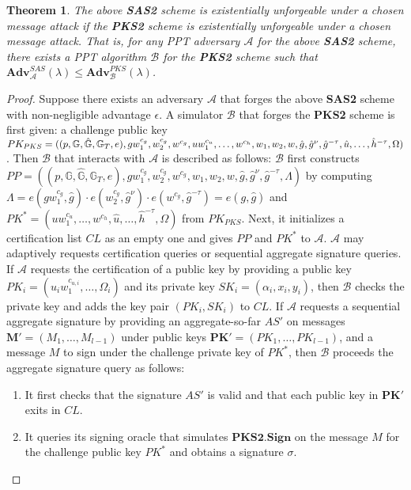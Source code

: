 \documentclass[11pt,letterpaper]{article}
\newcommand{\vect}[1]{\mathbf{#1}}
\newtheorem{theorem}{Theorem}[section]
\newcommand{\G}{\mathbb{G}}
\newcommand{\Adv}{\textbf{Adv}}
\newcommand{\mc}[1]{\mathcal{#1}}
\newcommand{\tb}[1]{\textbf{#1}}
\newcommand{\lb}{\linebreak[0]}
\begin{document}
\begin{theorem} \label{thm:sas2-prime}
The above \tb{SAS2} scheme is existentially unforgeable under a chosen
message attack if the \tb{PKS2} scheme is existentially unforgeable under a
chosen message attack. That is, for any PPT adversary $\mc{A}$ for the above
\tb{SAS2} scheme, there exists a PPT algorithm $\mc{B}$ for the \tb{PKS2}
scheme such that
    $\Adv_{\mc{A}}^{SAS}(\lambda) \leq \Adv_{\mc{B}}^{PKS}(\lambda)$.
\end{theorem}

\begin{proof}
Suppose there exists an adversary $\mc{A}$ that forges the above \tb{SAS2}
scheme with non-negligible advantage $\epsilon$. A simulator $\mc{B}$ that
forges the \tb{PKS2} scheme is first given: a challenge public key
    $PK_{PKS} = (
    (p, \G, \hat{\G}, \G_T, e),
    g w_1^{c_g}, w_2^{c_g}, w^{c_g}, u w_1^{c_u}, \lb \ldots, w^{c_h},
    w_1, w_2, w, \hat{g}, \hat{g}^{\nu}, \hat{g}^{-\tau}, \hat{u}, \ldots,
    \hat{h}^{-\tau}, \Omega )$.
Then $\mc{B}$ that interacts with $\mc{A}$ is described as follows:
$\mc{B}$ first constructs
    $PP = ( (p, \G, \hat{\G}, \G_T, e),
    g w_1^{c_g}, w_2^{c_g}, w^{c_g}, w_1, w_2, w,
    \hat{g}, \hat{g}^{\nu}, \hat{g}^{-\tau}, \Lambda )$
by computing $\Lambda = e(gw_1^{c_g}, \hat{g}) \cdot e(w_2^{c_g},
\hat{g}^{\nu}) \cdot e(w^{c_g}, \hat{g}^{-\tau}) = e(g, \hat{g})$ and
    $PK^* = ( u w_1^{c_u}, \ldots, w^{c_h}, \hat{u}, \ldots, \hat{h}^{-\tau},
    \Omega )$
from $PK_{PKS}$. Next, it initializes a certification list $CL$ as an empty
one and gives $PP$ and $PK^*$ to $\mc{A}$.
$\mc{A}$ may adaptively requests certification queries or sequential
aggregate signature queries. If $\mc{A}$ requests the certification of a
public key by providing a public key $PK_i = (u_i w_1^{c_{u,i}}, \ldots,
\Omega_i)$ and its private key $SK_i = (\alpha_i, x_i, y_i)$, then $\mc{B}$
checks the private key and adds the key pair $(PK_i, SK_i)$ to $CL$.
If $\mc{A}$ requests a sequential aggregate signature by providing an
aggregate-so-far $AS'$ on messages $\vect{M}' = (M_1, \ldots, M_{l-1})$ under
public keys $\vect{PK}' = (PK_1, \ldots, PK_{l-1})$, and a message $M$ to
sign under the challenge private key of $PK^*$, then $\mc{B}$ proceeds the
aggregate signature query as follows:
\begin{enumerate}
\item It first checks that the signature $AS'$ is valid and that each
    public key in $\vect{PK}'$ exits in $CL$.

\item It queries its signing oracle that simulates $\tb{PKS2.Sign}$ on
    the message $M$ for the challenge public key $PK^*$ and obtains a
    signature $\sigma$.


\end{enumerate}
\end{proof}
\end{document}
